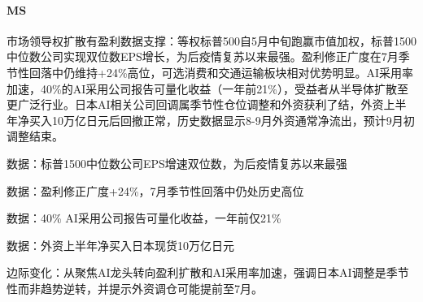 \documentclass[11pt]{ctexart}
\begin{document}
\paragraph{MS} 市场领导权扩散有盈利数据支撑：等权标普500自5月中旬跑赢市值加权，标普1500中位数公司实现双位数EPS增长，为后疫情复苏以来最强。盈利修正广度在7月季节性回落中仍维持+24\%高位，可选消费和交通运输板块相对优势明显。AI采用率加速，40\%的AI采用公司报告可量化收益（一年前21\%），受益者从半导体扩散至更广泛行业。日本AI相关公司回调属季节性仓位调整和外资获利了结，外资上半年净买入10万亿日元后回撤正常，历史数据显示8-9月外资通常净流出，预计9月初调整结束。
{\small\color{refgray}数据：标普1500中位数公司EPS增速双位数，为后疫情复苏以来最强\par}
{\small\color{refgray}数据：盈利修正广度+24\%，7月季节性回落中仍处历史高位\par}
{\small\color{refgray}数据：40\% AI采用公司报告可量化收益，一年前仅21\%\par}
{\small\color{refgray}数据：外资上半年净买入日本现货10万亿日元\par}
{\small\color{refgray}边际变化：从聚焦AI龙头转向盈利扩散和AI采用率加速，强调日本AI调整是季节性而非趋势逆转，并提示外资调仓可能提前至7月。\par}
\end{document}
